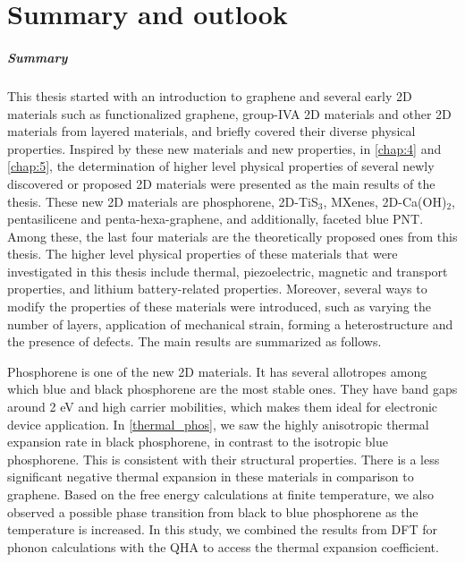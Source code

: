 
\chapter{Summary and outlook}


\paragraph{Summary} This thesis started with an introduction to graphene and several early 2D materials such as functionalized graphene, group-IVA 2D materials and other 2D materials from layered materials, and briefly covered their diverse physical properties. Inspired by these new materials and new properties, in \autoref{chap:4} and \autoref{chap:5}, the determination of higher level physical properties of several newly discovered or proposed 2D materials were presented as the main results of the thesis. These new 2D materials are phosphorene, 2D-TiS$_3$, MXenes, 2D-Ca(OH)$_2$, pentasilicene and penta-hexa-graphene, and additionally, faceted blue PNT. Among these, the last four materials are the theoretically proposed ones from this thesis. The higher level physical properties of these materials that were investigated in this thesis include thermal, piezoelectric, magnetic and transport properties, and lithium battery-related properties. Moreover, several ways to modify the properties of these materials were introduced, such as varying the number of layers, application of mechanical strain, forming a heterostructure and the presence of defects. The main results are summarized as follows.

Phosphorene is one of the new 2D materials. It has several allotropes among which blue and black phosphorene are the most stable ones. They have band gaps around 2 eV and high carrier mobilities, which makes them ideal for electronic device application. In \autoref{thermal_phos}, we saw the highly anisotropic thermal expansion rate in black phosphorene, in contrast to the isotropic blue phosphorene. This is consistent with their structural properties. There is a less significant negative thermal expansion in these materials in comparison to graphene. Based on the free energy calculations at finite temperature, we also observed a possible phase transition from black to blue phosphorene as the temperature is increased. In this study, we combined the results from DFT for phonon calculations with the QHA to access the thermal expansion coefficient.

